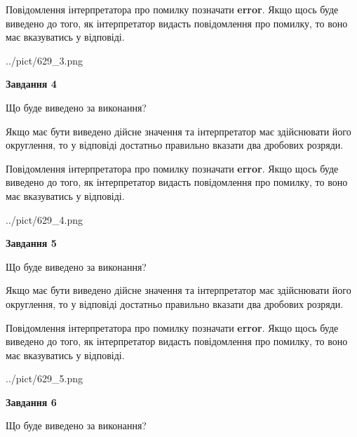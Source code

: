 \documentclass[12pt, ukrainian]{article}
\begin{document}
{\begin {Large}
Повідомлення інтерпретатора про помилку позначати \textbf{error}.
Якщо щось буде виведено до того, як інтерпретатор видасть повідомлення про помилку, 
то воно має вказуватись у відповіді. \par

\begin{center}
	{../pict/629_3.png}
\end{center}
\newpage

{\begin {center}\textbf{Завдання 4}\end {center}}\par
Що буде виведено за виконання? \par

Якщо має бути виведено дійсне значення та інтерпретатор має здійснювати його округлення, 
то у відповіді достатньо правильно вказати два дробових розряди.

Повідомлення інтерпретатора про помилку позначати \textbf{error}.
Якщо щось буде виведено до того, як інтерпретатор видасть повідомлення про помилку, 
то воно має вказуватись у відповіді. \par

\begin{center}
	{../pict/629_4.png}
\end{center}
\newpage

{\begin {center}\textbf{Завдання 5}\end {center}}\par
Що буде виведено за виконання? \par

Якщо має бути виведено дійсне значення та інтерпретатор має здійснювати його округлення, 
то у відповіді достатньо правильно вказати два дробових розряди.

Повідомлення інтерпретатора про помилку позначати \textbf{error}.
Якщо щось буде виведено до того, як інтерпретатор видасть повідомлення про помилку, 
то воно має вказуватись у відповіді. \par

\begin{center}
	{../pict/629_5.png}
\end{center}
\newpage

{\begin {center}\textbf{Завдання 6}\end {center}}\par
Що буде виведено за виконання? \par


\end{Large}}
\end{document}
